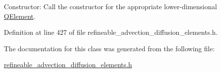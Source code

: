 Constructor\+: Call the constructor for the appropriate lower-\/dimensional \hyperlink{classoomph_1_1QElement}{Q\+Element}. 



Definition at line 427 of file refineable\+\_\+advection\+\_\+diffusion\+\_\+elements.\+h.



The documentation for this class was generated from the following file\+:\begin{DoxyCompactItemize}
\item 
\hyperlink{refineable__advection__diffusion__elements_8h}{refineable\+\_\+advection\+\_\+diffusion\+\_\+elements.\+h}\end{DoxyCompactItemize}
